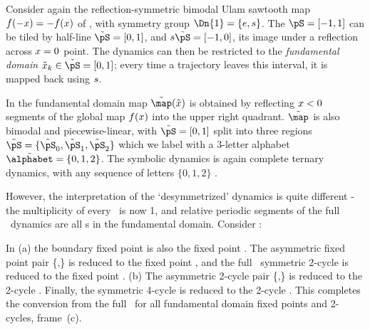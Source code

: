 { \label{dscr:C2FundDom}
                     \toCB
Consider again
the reflection-symmetric bimodal Ulam sawtooth map $f(-x)=-f(x)$
of , with symmetry group $\Dn{1}=\{{ e},\Refl\}$.
The {\statesp} $\pS = [-1,1]$
can be tiled by half-line $\tilde{\pS}=[0,1]$, and
${ \Refl}\tilde{\pS}=[-1,0]$, its image under
a reflection across $x=0$ point.
The dynamics can then be restricted to the
{\em fundamental domain} $\tilde{\ssp}_k \in \tilde{\pS}=[0,1]$;
every time a trajectory leaves this interval, it is
mapped back using $\Refl$.

In 
the fundamental
domain map ${\tilde\map}({\tilde \ssp})$
is obtained by reflecting $x < 0$ segments
of the global map $f(x)$ %
into the upper right quadrant.
${\tilde\map}$ is also bimodal and piecewise-linear,
with $\tilde{\pS} = [0,1]$ split into three regions
$\tilde{\pS} = \{\tilde{\pS}_0,\tilde{\pS}_1,\tilde{\pS}_2\}$
which we label with a 3-letter alphabet
$\tilde{\alphabet} = \{0,1,2\}$.
The symbolic dynamics is
again complete ternary dynamics, with any sequence of
letters $\{0,1,2\}$ \admissible.

However, the interpretation of the `desymmetrized'
dynamics is quite different - the multiplicity of
every \po\ is now 1, and {relative periodic segments}
of the full \statesp\ dynamics
are all \po s in the fundamental domain.
Consider :

In (a)
the boundary fixed point  is also the fixed point .
%
The asymmetric fixed point pair \{,\}
is reduced to the fixed point ,
and the full \statesp\ symmetric 2-cycle
 is reduced to the fixed point .
(b) The asymmetric 2-cycle pair
\{,\} is reduced to the 2-cycle .
Finally, the symmetric 4-cycle
 is reduced to the 2-cycle .
This completes the conversion from the full \statesp\ for all
fundamental domain fixed points and 2-cycles,
frame~(c).
    } %

\renewcommand{\Refl}{\ensuremath{{s}}} %
